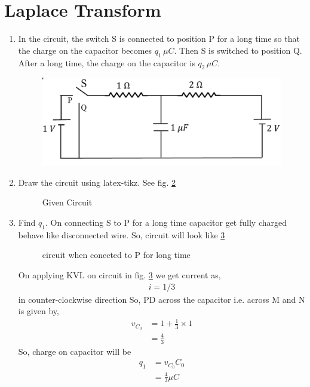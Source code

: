 \documentclass[journal,12pt,twocolumn]{IEEEtran}
\renewcommand\thesection{\arabic{section}}
\begin{document}
 \section{Laplace Transform}
\begin{enumerate}[label=\arabic*.,ref=\thesection.\theenumi]
\item In the circuit, the switch S is connected to position P for a long time so that the charge on the capacitor
	becomes $q_1 \, \mu C$. Then S is switched to position Q.  After a long time, the charge on the capacitor is
		$q_2 \, \mu C$.
		\begin{figure}[!ht]
			\centering
			\includegraphics[width=\columnwidth]{figs/ckt.jpg}
			\caption{}
			\label{fig:ckt}
\end{figure}
\item Draw the circuit using latex-tikz.
	\solution See fig. \ref{crct:2.2}
\begin{figure}[!ht]
	
	\centering
	\caption{Given Circuit}
	\label{crct:2.2}
\end{figure}
\item Find $q_1$.
	\solution
		On connecting S to P for a long time capacitor get fully charged behave like disconnected wire. So, circuit will look like \ref{crct:2.3}
\begin{figure}[!ht]
	
	\centering
	\caption{circuit when conected to P for long time}
	\label{crct:2.3}
\end{figure}
		On applying KVL on circuit in fig. \ref{crct:2.3} we get current as,
		\begin{align}
			i=1/3	
		\end{align}
in counter-clockwise direction
So, PD across the capacitor i.e. across M and N is given by,
		\begin{align}
			v_{C_0}&=1+\frac{1}{3}\times 1\\
			&=\frac{4}{3}
		\end{align}
		So, charge on capacitor will be
		\begin{align}
			q_1&=v_{C_0}C_0\\
			&=\frac{4}{3}\mu C
		\end{align}
			

\end{enumerate}
\end{document}
